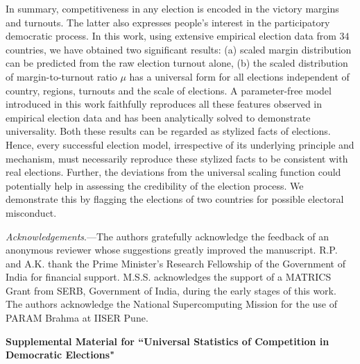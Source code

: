 \documentclass[reprint,aps,prl,showpacs,twocolumn, superscriptaddress]{revtex4-2}
\begin{document}
In summary, competitiveness in any election is encoded in the victory margins and turnouts. The latter also expresses people's interest in the participatory democratic process. In this work, using extensive empirical election data from $34$ countries, we have obtained two significant results: (a) scaled margin distribution can be predicted from the raw election turnout alone, (b) the scaled distribution of margin-to-turnout ratio $\mu$ has a universal form for all elections independent of country, regions, turnouts and the scale of elections. A parameter-free model introduced in this work faithfully reproduces all these features observed in empirical election data and has been analytically solved to demonstrate universality. Both these results can be regarded as stylized facts of elections. Hence, every successful election model, irrespective of its underlying principle and mechanism, must necessarily reproduce these stylized facts to be consistent with real elections. Further, the deviations from the universal scaling function could potentially help in assessing the credibility of the election process. We demonstrate this by flagging the elections of two countries for possible electoral misconduct.

\begin{acknowledgments}
\emph{Acknowledgements}.---The authors gratefully acknowledge the feedback of an anonymous reviewer whose suggestions greatly improved the manuscript. R.P. and A.K. thank the Prime Minister’s Research Fellowship of the Government of India for financial support.  M.S.S. acknowledges the support of a MATRICS Grant from SERB, Government of India, during the early stages of this work. The authors acknowledge the National Supercomputing Mission for the use of PARAM Brahma at IISER Pune.
\end{acknowledgments}



\newpage
\setcounter{page}{1}
\renewcommand{\thepage}{S\arabic{page}}
\setcounter{equation}{0}
\renewcommand{\theequation}{S\arabic{equation}}
\setcounter{figure}{0}
\renewcommand{\thefigure}{S\arabic{figure}}
\setcounter{section}{0}
\renewcommand{\thesection}{S\arabic{section}}
\setcounter{table}{0}
\renewcommand{\thetable}{S\arabic{table}}

\onecolumngrid
\newpage
\begin{center}
\textbf{\large Supplemental Material for ``Universal Statistics of Competition in Democratic Elections"}
\end{center}
% 
\end{document}
